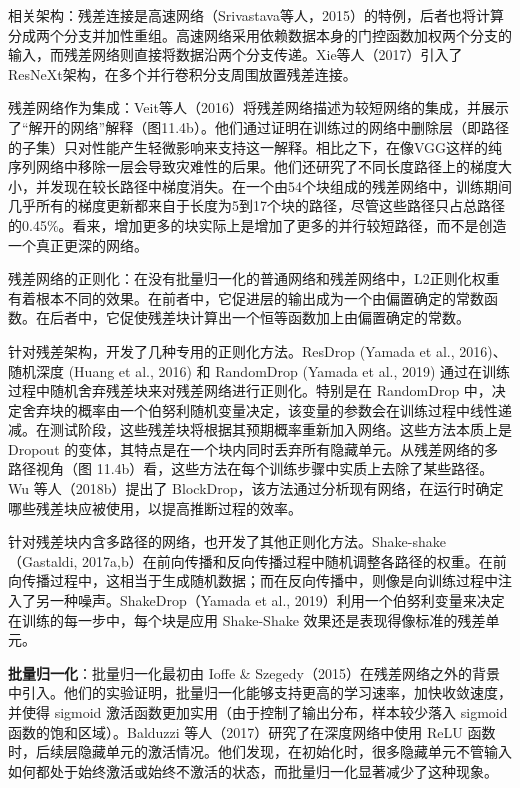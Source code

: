 相关架构：残差连接是高速网络（Srivastava等人，2015）的特例，后者也将计算分成两个分支并加性重组。高速网络采用依赖数据本身的门控函数加权两个分支的输入，而残差网络则直接将数据沿两个分支传递。Xie等人（2017）引入了ResNeXt架构，在多个并行卷积分支周围放置残差连接。

残差网络作为集成：Veit等人（2016）将残差网络描述为较短网络的集成，并展示了“解开的网络”解释（图11.4b）。他们通过证明在训练过的网络中删除层（即路径的子集）只对性能产生轻微影响来支持这一解释。相比之下，在像VGG这样的纯序列网络中移除一层会导致灾难性的后果。他们还研究了不同长度路径上的梯度大小，并发现在较长路径中梯度消失。在一个由54个块组成的残差网络中，训练期间几乎所有的梯度更新都来自于长度为5到17个块的路径，尽管这些路径只占总路径的0.45\%。看来，增加更多的块实际上是增加了更多的并行较短路径，而不是创造一个真正更深的网络。

残差网络的正则化：在没有批量归一化的普通网络和残差网络中，L2正则化权重有着根本不同的效果。在前者中，它促进层的输出成为一个由偏置确定的常数函数。在后者中，它促使残差块计算出一个恒等函数加上由偏置确定的常数。

针对残差架构，开发了几种专用的正则化方法。ResDrop (Yamada et al., 2016)、随机深度 (Huang et al., 2016) 和 RandomDrop (Yamada et al., 2019) 通过在训练过程中随机舍弃残差块来对残差网络进行正则化。特别是在 RandomDrop 中，决定舍弃块的概率由一个伯努利随机变量决定，该变量的参数会在训练过程中线性递减。在测试阶段，这些残差块将根据其预期概率重新加入网络。这些方法本质上是 Dropout 的变体，其特点是在一个块内同时丢弃所有隐藏单元。从残差网络的多路径视角（图 11.4b）看，这些方法在每个训练步骤中实质上去除了某些路径。Wu 等人（2018b）提出了 BlockDrop，该方法通过分析现有网络，在运行时确定哪些残差块应被使用，以提高推断过程的效率。

针对残差块内含多路径的网络，也开发了其他正则化方法。Shake-shake（Gastaldi, 2017a,b）在前向传播和反向传播过程中随机调整各路径的权重。在前向传播过程中，这相当于生成随机数据；而在反向传播中，则像是向训练过程中注入了另一种噪声。ShakeDrop（Yamada et al., 2019）利用一个伯努利变量来决定在训练的每一步中，每个块是应用 Shake-Shake 效果还是表现得像标准的残差单元。

\textbf{批量归一化}：批量归一化最初由 Ioffe \& Szegedy（2015）在残差网络之外的背景中引入。他们的实验证明，批量归一化能够支持更高的学习速率，加快收敛速度，并使得 sigmoid 激活函数更加实用（由于控制了输出分布，样本较少落入 sigmoid 函数的饱和区域）。Balduzzi 等人（2017）研究了在深度网络中使用 ReLU 函数时，后续层隐藏单元的激活情况。他们发现，在初始化时，很多隐藏单元不管输入如何都处于始终激活或始终不激活的状态，而批量归一化显著减少了这种现象。

